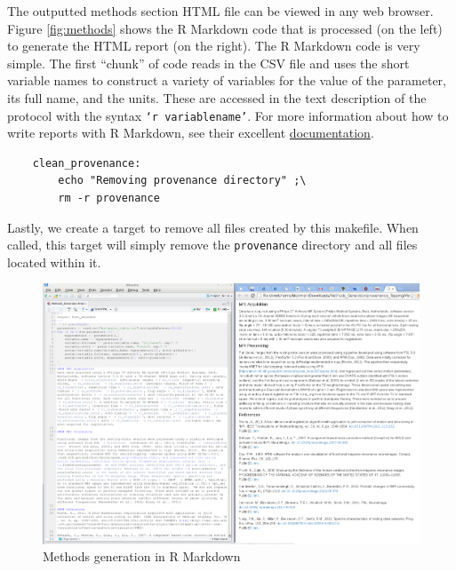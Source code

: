 The outputted methods section HTML file can be viewed in any web browser. Figure \autoref{fig:methods} shows the R Markdown code that is processed (on the left) to generate the HTML report (on the right). The R Markdown code is very simple. The first ``chunk'' of code reads in the CSV file and uses the short variable names to construct a variety of variables for the value of the parameter, its full name, and the units. These are accessed in the text description of the protocol with the syntax \texttt{`r variablename'}. For more information about how to write reports with R Markdown, see their excellent \href{http://rmarkdown.rstudio.com}{documentation}. 

\begin{lstlisting}
	clean_provenance:
		echo "Removing provenance directory" ;\
		rm -r provenance
\end{lstlisting}

Lastly, we create a target to remove all files created by this makefile. When called, this target will simply remove the \texttt{provenance} directory and all files located within it.



\begin{figure}
	\begin{center}
		\includegraphics[width=7in]{images/MethodsGenerator.png}
		\caption{Methods generation in R Markdown}
                \label{fig:methods}
	\end{center}
\end{figure}